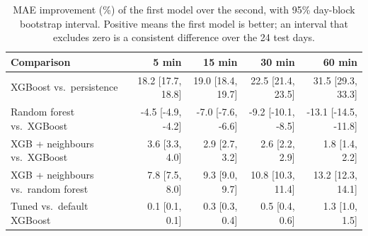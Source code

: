 \begin{table}[t]
\centering
\caption{MAE improvement (\%) of the first model over the second, with 95\% day-block bootstrap interval. Positive means the first model is better; an interval that excludes zero is a consistent difference over the 24 test days.}
\label{tab:improve}
\small
\begin{tabular}{@{}lrrrr@{}}
\toprule
Comparison & 5 min & 15 min & 30 min & 60 min \\
\midrule
XGBoost vs.\ persistence & 18.2 [17.7, 18.8] & 19.0 [18.4, 19.7] & 22.5 [21.4, 23.5] & 31.5 [29.3, 33.3] \\
Random forest vs.\ XGBoost & -4.5 [-4.9, -4.2] & -7.0 [-7.6, -6.6] & -9.2 [-10.1, -8.5] & -13.1 [-14.5, -11.8] \\
XGB + neighbours vs.\ XGBoost & 3.6 [3.3, 4.0] & 2.9 [2.7, 3.2] & 2.6 [2.2, 2.9] & 1.8 [1.4, 2.2] \\
XGB + neighbours vs.\ random forest & 7.8 [7.5, 8.0] & 9.3 [9.0, 9.7] & 10.8 [10.3, 11.4] & 13.2 [12.3, 14.1] \\
Tuned vs.\ default XGBoost & 0.1 [0.1, 0.1] & 0.3 [0.3, 0.4] & 0.5 [0.4, 0.6] & 1.3 [1.0, 1.5] \\
\bottomrule
\end{tabular}
\end{table}
